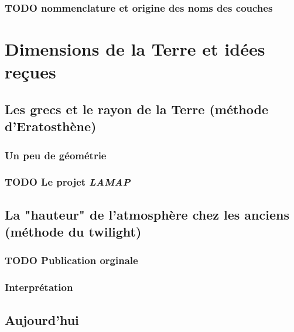 \documentclass[letterpaper, 11pt]{article}
\begin{document}
\subsubsection*{{\bfseries\sffamily TODO} nommenclature et origine des noms des couches}
\label{sec:org2fb8cbd}
\newpage
\section{Dimensions de la Terre et idées reçues}
\label{sec:org6cbb3c1}
\subsection{Les grecs et le rayon de la Terre (méthode d'Eratosthène)}
\label{sec:org791fd05}

\subsubsection*{Un peu de géométrie}
\label{sec:orgf58bd53}
\subsubsection*{{\bfseries\sffamily TODO} Le projet \emph{LAMAP}}
\label{sec:org896798a}
\subsection{La "hauteur" de l'atmosphère chez les anciens (méthode du twilight)}
\label{sec:orgff4d7da}

\subsubsection*{{\bfseries\sffamily TODO} Publication orginale}
\label{sec:org0e6dc9f}

\subsubsection*{Interprétation}
\label{sec:org96a59d1}

\subsection{Aujourd'hui}
\label{sec:org721eb88}
\end{document}
